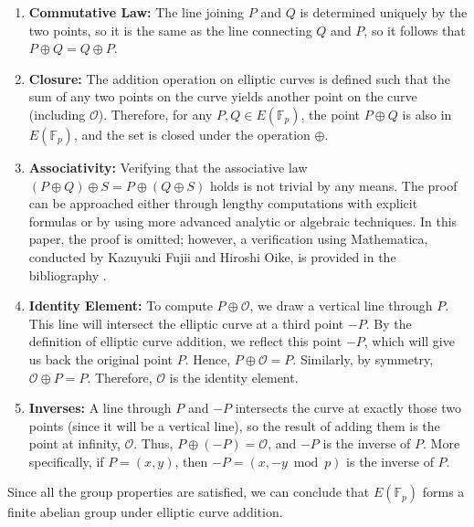 \documentclass[11pt]{article}
\begin{document}
\begin{enumerate}
\item \textbf{Commutative Law:} The line joining \(P\) and \(Q\) is determined uniquely by the two points, so it is the same as the line connecting \(Q\) and \(P\), so it follows that \(P\oplus Q=Q\oplus P\). 

\item \textbf{Closure:} The addition operation on elliptic curves is defined such that the sum of any two points on the curve yields another point on the curve (including \(\mathcal{O}\)). Therefore, for any \( P, Q \in E(\mathbb{F}_p) \), the point \( P \oplus Q \) is also in \( E(\mathbb{F}_p) \), and the set is closed under the operation \( \oplus \).

\item \textbf{Associativity:} Verifying that the associative law \((P\oplus Q)\oplus S=P\oplus(Q \oplus S)\) holds is not trivial by any means. The proof can be approached either through lengthy computations with explicit formulas or by using more advanced analytic or algebraic techniques. In this paper, the proof is omitted; however, a verification using Mathematica, conducted by Kazuyuki Fujii and Hiroshi Oike, is provided in the bibliography \cite{fujiioike}.

\item \textbf{Identity Element:} To compute \( P \oplus \mathcal{O} \), we draw a vertical line through \( P \). This line will intersect the elliptic curve at a third point \( -P \). By the definition of elliptic curve addition, we reflect this point \(-P\), which will give us back the original point \( P \). Hence, \( P \oplus \mathcal{O} = P \). Similarly, by symmetry, \( \mathcal{O} \oplus P = P \). Therefore, \( \mathcal{O} \) is the identity element.

\item \textbf{Inverses:} A line through \( P \) and \( -P \) intersects the curve at exactly those two points (since it will be a vertical line), so the result of adding them is the point at infinity, \( \mathcal{O} \). Thus, \( P \oplus (-P) = \mathcal{O} \), and \( -P \) is the inverse of \( P \). More specifically, if \( P = (x, y) \), then \( -P = (x, -y \bmod p) \) is the inverse of \( P \).

\end{enumerate}
Since all the group properties are satisfied, we can conclude that \( E(\mathbb{F}_p) \) forms a finite abelian group under elliptic curve addition.
\end{document}
